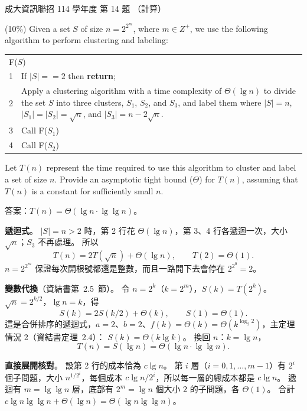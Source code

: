 \begin{pastexam}[label={px:ncku-114-prog-14}]{成大資訊聯招 114 學年度 第 14 題}
（計算）

(10\%) Given a set $S$ of size $n=2^{2^m}$, where $m\in Z^+$, we use the following algorithm to perform clustering and labeling:
\begin{center}
\begin{tabular}{|l|p{}|}
\hline
\multicolumn{2}{|l|}{F($S$)} \\
1 & If $|S|==2$ then \textbf{return}; \\
2 & Apply a clustering algorithm with a time complexity of $\Theta(\lg n)$ to divide the set $S$ into three clusters, $S_1$, $S_2$, and $S_3$, and label them where $|S|=n$, $|S_1|=|S_2|=\sqrt{n}$, and $|S_3|=n-2\sqrt{n}$. \\
3 & Call F($S_1$) \\
4 & Call F($S_2$) \\
\hline
\end{tabular}
\end{center}
\smallskip
Let $T(n)$ represent the time required to use this algorithm to cluster and label a set of size $n$. Provide an asymptotic tight bound ($\Theta$) for $T(n)$, assuming that $T(n)$ is a constant for sufficiently small $n$.
\end{pastexam}

\begin{pastsoln}
答案：$T(n) = \Theta(\lg n \cdot \lg\lg n)$。

\textbf{遞迴式}。 $|S| = n > 2$ 時，第 2 行花 $\Theta(\lg n)$，第 3、4 行各遞迴一次，大小 $\sqrt{n}$；$S_3$ 不再處理。 所以
\[
T(n) = 2T(\sqrt{n}) + \Theta(\lg n), \qquad T(2) = \Theta(1).
\]
$n = 2^{2^m}$ 保證每次開根號都還是整數，而且一路開下去會停在 $2^{2^0} = 2$。

\textbf{變數代換}（資結書第~2.5~節）。 令 $n = 2^k$（$k = 2^m$），$S(k) = T(2^k)$。 $\sqrt{n} = 2^{k/2}$，$\lg n = k$，得
\[
S(k) = 2S(k/2) + \Theta(k), \qquad S(1) = \Theta(1).
\]
這是合併排序的遞迴式，$a = 2$、$b = 2$、$f(k) = \Theta(k) = \Theta(k^{\log_2 2})$，主定理情況 2（資結書定理~2.4）：
$S(k) = \Theta(k \lg k)$。 換回 $n$：$k = \lg n$，
\[
T(n) = S(\lg n) = \Theta(\lg n \cdot \lg\lg n).
\]

\textbf{直接展開核對}。 設第 2 行的成本恰為 $c\lg n$。 第 $i$ 層（$i = 0, 1, \ldots, m - 1$）有 $2^i$ 個子問題，大小
$n^{1/2^i}$，每個成本 $c \lg n / 2^i$，所以每一層的總成本都是 $c\lg n$。 遞迴有 $m = \lg\lg n$ 層，底部有 $2^m = \lg n$ 個大小
$2$ 的子問題，各 $\Theta(1)$。 合計 $c \lg n \lg\lg n + \Theta(\lg n) = \Theta(\lg n \lg\lg n)$。
\end{pastsoln}
